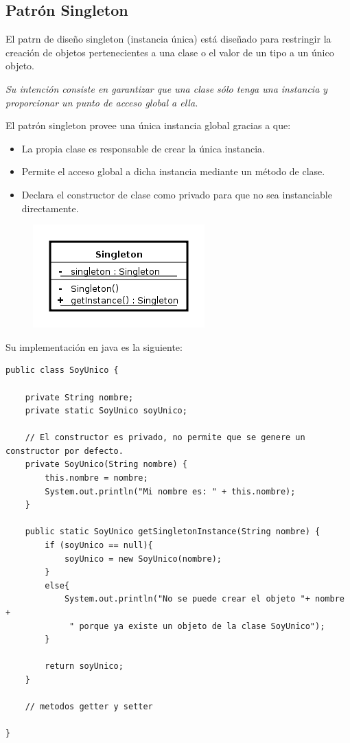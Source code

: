 \documentclass[4paper]{article}
\begin{document}
\subsection{Patrón Singleton}
El patrn de diseño singleton (instancia única) está diseñado para restringir la creación de objetos pertenecientes a una clase o el valor de un tipo a un único objeto.\par 
\emph{Su intención consiste en garantizar que una clase sólo tenga una instancia y proporcionar un punto de acceso global a ella.}\par 
El patrón singleton provee una única instancia global gracias a que:
\begin{itemize}
\item La propia clase es responsable de crear la única instancia.
\item Permite el acceso global a dicha instancia mediante un método de clase.
\item Declara el constructor de clase como privado para que no sea instanciable directamente.
\end{itemize}
\begin{figure}[H]
\centering
\includegraphics[scale=0.5]{imagenes/singleton.png}
\end{figure}
\newpage
Su implementación en java es la siguiente:
\begin{lstlisting}
public class SoyUnico {

    private String nombre;
    private static SoyUnico soyUnico;

    // El constructor es privado, no permite que se genere un constructor por defecto.
    private SoyUnico(String nombre) {
        this.nombre = nombre;
        System.out.println("Mi nombre es: " + this.nombre);
    }

    public static SoyUnico getSingletonInstance(String nombre) {
        if (soyUnico == null){
            soyUnico = new SoyUnico(nombre);
        }
        else{
            System.out.println("No se puede crear el objeto "+ nombre +
             " porque ya existe un objeto de la clase SoyUnico");
        }
        
        return soyUnico;
    }
    
    // metodos getter y setter

}
\end{lstlisting}
\end{document}
